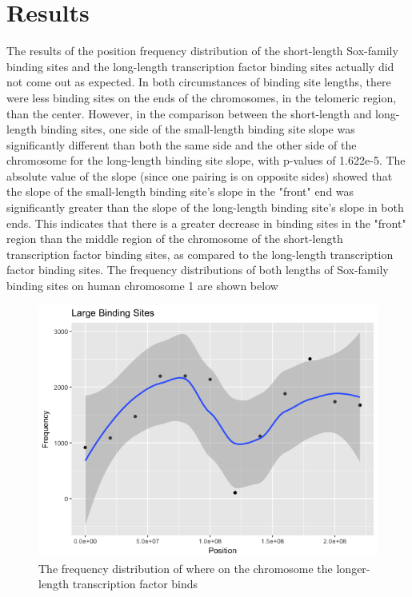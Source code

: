 \documentclass[12pt, a4paper]{article}
\begin{document}
\section{Results}
The results of the position frequency distribution of the short-length Sox-family binding sites and the long-length transcription factor binding sites actually did not come out as expected. In both circumstances of binding site lengths, there were less binding sites on the ends of the chromosomes, in the telomeric region, than the center. However, in the comparison between the short-length and long-length binding sites, one side of the small-length binding site slope was significantly different than both the same side and the other side of the chromosome for the long-length binding site slope, with p-values of 1.622e-5. The absolute value of the slope (since one pairing is on opposite sides) showed that the slope of the small-length binding site's slope in the "front" end was significantly greater than the slope of the long-length binding site's slope in both ends. This indicates that there is a greater decrease in binding sites in the "front" region than the middle region of the chromosome of the short-length transcription factor binding sites, as compared to the long-length transcription factor binding sites. The frequency distributions of both lengths of Sox-family binding sites on human chromosome 1 are shown below
\begin{figure}[H]
\caption{The frequency distribution of where on the chromosome the longer-length transcription factor binds}
\centering
\includegraphics[width=\textwidth]{largebsplot.png}
\end{figure}
\end{document}
